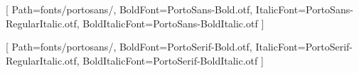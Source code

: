 \usepackage{fontspec}
\usepackage{titlesec}

\setmainfont{PortoSans-Regular.otf}[
    Path=fonts/portosans/,
    BoldFont={PortoSans-Bold.otf},
    ItalicFont={PortoSans-RegularItalic.otf},
    BoldItalicFont={PortoSans-BoldItalic.otf}
]

\setsansfont{PortoSerif-Regular.otf}[
    Path=fonts/portosans/,
    BoldFont={PortoSerif-Bold.otf},
    ItalicFont={PortoSerif-RegularItalic.otf},
    BoldItalicFont={PortoSerif-BoldItalic.otf}
]
